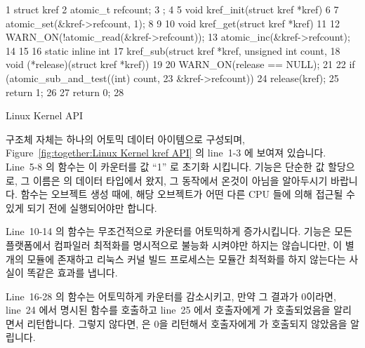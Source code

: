 \begin{listing}[tbp]
{ \scriptsize
\begin{verbbox}
  1 struct kref {
  2   atomic_t refcount;
  3 };
  4 
  5 void kref_init(struct kref *kref)
  6 {
  7   atomic_set(&kref->refcount, 1);
  8 }
  9 
 10 void kref_get(struct kref *kref)
 11 {
 12   WARN_ON(!atomic_read(&kref->refcount));
 13   atomic_inc(&kref->refcount);
 14 }
 15 
 16 static inline int
 17 kref_sub(struct kref *kref, unsigned int count,
 18          void (*release)(struct kref *kref))
 19 {
 20   WARN_ON(release == NULL);
 21 
 22   if (atomic_sub_and_test((int) count,
 23                           &kref->refcount)) {
 24     release(kref);
 25     return 1;
 26   }
 27   return 0;
 28 }
\end{verbbox}
}
\centering
\theverbbox
\caption{Linux Kernel  API}
\label{lst:together:Linux Kernel kref API}
\end{listing}

 구조체 자체는 하나의 어토믹 데이터 아이템으로 구성되며,
Figure~\ref{fig:together:Linux Kernel kref API} 의 line~1-3 에 보여져 있습니다.
Line~5-8 의  함수는 이 카운터를 값 ``1'' 로 초기화 시킵니다.
 기능은 단순한 값 할당으로, 그 이름은  의 데이터
타입에서 왔지, 그 동작에서 온것이 아님을 알아두시기 바랍니다.
 함수는 오브젝트 생성 때에, 해당 오브젝트가 어떤 다른 CPU 들에
의해 접근될 수 있게 되기 전에 실행되어야만 합니다.
\iffalse

The \co{kref} structure itself, consisting of a single atomic
data item, is shown in lines~1-3 of
Listing~\ref{lst:together:Linux Kernel kref API}.
The \co{kref_init()} function on lines~5-8 initializes the counter
to the value ``1''.
Note that the \co{atomic_set()} primitive is a simple
assignment, the name stems from the data type of \co{atomic_t}
rather than from the operation.
The \co{kref_init()} function must be invoked during object creation,
before the object has been made available to any other CPU.
\fi

Line~10-14 의  함수는 무조건적으로 카운터를 어토믹하게
증가시킵니다.
 기능은 모든 플랫폼에서 컴파일러 최적화를 명시적으로 불능화
시켜야만 하지는 않습니다만,  이 별개의 모듈에 존재하고 리눅스 커널
빌드 프로세스는 모듈간 최적화를 하지 않는다는 사실이 똑같은 효과를 냅니다.

Line~16-28 의  함수는 어토믹하게 카운터를 감소시키고, 만약 그
결과가 0이라면, line~24 에서 명시된  함수를 호출하고 line~25 에서
호출자에게  가 호출되었음을 알리면서 리턴합니다.
그렇지 않다면,  은 0을 리턴해서 호출자에게  가
호출되지 않았음을 알립니다.
\iffalse

